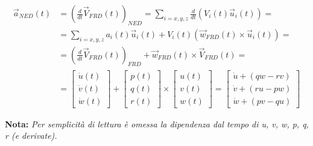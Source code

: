 \begin{equation}
    \label{eq:accelerazioneNED}
    \begin{split}
        \vec{a}_{NED}(t) & = \left(\frac{d}{d t}\vec{V}_{FRD}(t)\right)_{NED} = \sum_{i=x,y,z} \frac{d}{d t}\left(V_i(t)\vec{u}_i(t)\right) = \\
                         & = \sum_{i=x,y,z} a_i(t)\vec{u}_i(t) + V_i(t)\left(\vec{w}_{FRD}(t)\times\vec{u}_i(t)\right) =                      \\
                         & = \left(\frac{d}{d t} \vec{V}_{FRD}(t)\right)_{FRD} + \vec{w}_{FRD}(t)\times\vec{V}_{FRD}(t) =                     \\
                         & = \begin{bmatrix}
                                 \dot{u}(t) \\
                                 \dot{v}(t) \\
                                 \dot{w}(t)
                             \end{bmatrix} + \begin{bmatrix}
                                                 p(t) \\
                                                 q(t) \\
                                                 r(t)
                                             \end{bmatrix}\times \begin{bmatrix}
                                                                     u(t) \\
                                                                     v(t) \\
                                                                     w(t)
                                                                 \end{bmatrix}
        = \begin{bmatrix}
              \dot{u} + \left(qw - rv\right) \\
              \dot{v} + \left(ru - pw\right) \\
              \dot{w} + \left(pv - qu\right)
          \end{bmatrix}
    \end{split}
\end{equation}

\textbf{Nota:} \textit{Per semplicità di lettura è omessa la dipendenza dal tempo di u, v, w, p, q, r (e derivate).}

